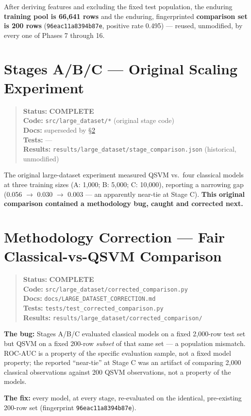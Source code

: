 \documentclass[11pt,a4paper]{article}
\newcommand{\code}[1]{\texttt{\small #1}}
\newcommand{\done}{\textcolor{donecolor}{\textbf{COMPLETE}}}
\newcommand{\phasestatus}[5]{%
\begin{quote}\small\raggedright
\textbf{Status:} #1 \\
\textbf{Code:} #2 \\
\textbf{Docs:} #3 \\
\textbf{Tests:} #4 \\
\textbf{Results:} #5
\end{quote}}
\begin{document}
After deriving features and excluding the fixed test population, the enduring \textbf{training pool is 66,641 rows} and the enduring, fingerprinted \textbf{comparison set is 200 rows} (\code{96eac11a8394b87e}, positive rate 0.495) --- reused, unmodified, by every one of Phases 7 through 16.

\section{Stages A/B/C --- Original Scaling Experiment}
\label{sec:stageabc}

\phasestatus{\done}{\code{src/large\_dataset/*} (original stage code)}{superseded by \S\ref{sec:correction}}{---}{\code{results/large\_dataset/stage\_comparison.json} (historical, unmodified)}

The original large-dataset experiment measured QSVM vs.\ four classical models at three training sizes (A: 1,000; B: 5,000; C: 10,000), reporting a narrowing gap (0.056 $\to$ 0.030 $\to$ 0.003 --- an apparently near-tie at Stage C). \textbf{This original comparison contained a methodology bug, caught and corrected next.}

\section{Methodology Correction --- Fair Classical-vs-QSVM Comparison}
\label{sec:correction}

\phasestatus{\done}{\code{src/large\_dataset/corrected\_comparison.py}}{\code{docs/LARGE\_DATASET\_CORRECTION.md}}{\code{tests/test\_corrected\_comparison.py}}{\code{results/large\_dataset/corrected\_comparison/}}

\textbf{The bug:} Stages A/B/C evaluated classical models on a fixed 2,000-row test set but QSVM on a fixed 200-row \emph{subset} of that same set --- a population mismatch. ROC-AUC is a property of the specific evaluation sample, not a fixed model property; the reported ``near-tie'' at Stage C was an artifact of comparing 2,000 classical observations against 200 QSVM observations, not a property of the models.

\textbf{The fix:} every model, at every stage, re-evaluated on the identical, pre-existing 200-row set (fingerprint \code{96eac11a8394b87e}).
\end{document}
